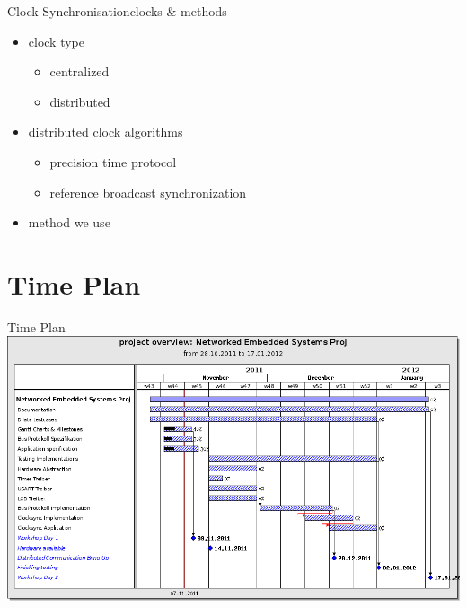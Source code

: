 \documentclass{beamer}
\begin{document}
\begin{frame}{Clock Synchronisation}{clocks \& methods}
  \begin{center}
  \begin{itemize}
    \item \begin{large}clock type\end{large}
    \begin{itemize}
      \item centralized
      \item distributed
    \end{itemize}
    \item \begin{large}distributed clock algorithms\end{large}
    \begin{itemize}
      \item precision time protocol
      \item reference broadcast synchronization
    \end{itemize}
  \item \begin{large}method we use\end{large}
  \end{itemize}
  \end{center}
\end{frame}


\section{Time Plan}
\begin{frame}{Time Plan}
\includegraphics[width=1.0\textwidth]{./images/201111_ganttchart.png}
\vspace{1cm}
\end{frame}
\end{document}
